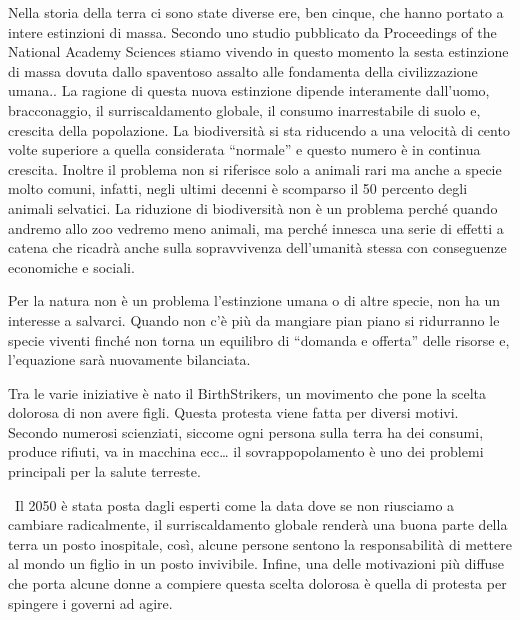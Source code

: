 \documentclass[12pt]{book} %
\begin{document}
Nella storia della terra ci sono state diverse ere, ben cinque, che hanno portato a intere estinzioni di massa. Secondo
uno studio pubblicato da Proceedings of the National Academy
Sciences stiamo vivendo in questo momento la sesta
estinzione di massa dovuta dallo {\textquotedbl}spaventoso assalto alle fondamenta della civilizzazione
umana.{\textquotedbl}. La ragione di questa nuova estinzione dipende interamente dall'uomo,
bracconaggio, il surriscaldamento globale, il consumo inarrestabile di suolo e, crescita della popolazione. La
biodiversità si sta riducendo a una velocità di cento volte superiore a quella considerata “normale” e questo numero è
in continua crescita. Inoltre il problema non si riferisce solo a animali rari ma anche a specie molto comuni, infatti,
negli ultimi decenni è scomparso il 50 percento degli animali selvatici. La riduzione di biodiversità non è un problema
perché quando andremo allo zoo vedremo meno animali, ma perché innesca una serie di effetti a catena che ricadrà anche
sulla sopravvivenza dell'umanità stessa con conseguenze economiche e
sociali.

Per la natura non è un problema l'estinzione umana o di altre specie, non ha un interesse a
salvarci. Quando non c'è più da mangiare pian piano si ridurranno le specie viventi finché non
torna un equilibro di “domanda e offerta” delle risorse e, l'equazione sarà nuovamente bilanciata.


\bigskip

Tra le varie iniziative è nato il
BirthStrikers, un movimento che pone la scelta dolorosa di non avere figli. Questa protesta viene fatta per diversi motivi. Secondo
numerosi scienziati, siccome ogni persona sulla terra ha dei consumi, produce rifiuti, va in macchina ecc… il
sovrappopolamento è uno dei problemi principali per la salute
terreste.

\ Il 2050 è stata posta dagli esperti come la data dove se non riusciamo a cambiare radicalmente, il surriscaldamento
globale renderà una buona parte della terra un posto inospitale, così, alcune persone sentono la responsabilità di
mettere al mondo un figlio in un posto invivibile. Infine, una delle motivazioni più diffuse che porta alcune donne a
compiere questa scelta dolorosa è quella di protesta per spingere i governi ad
agire.
\end{document}
